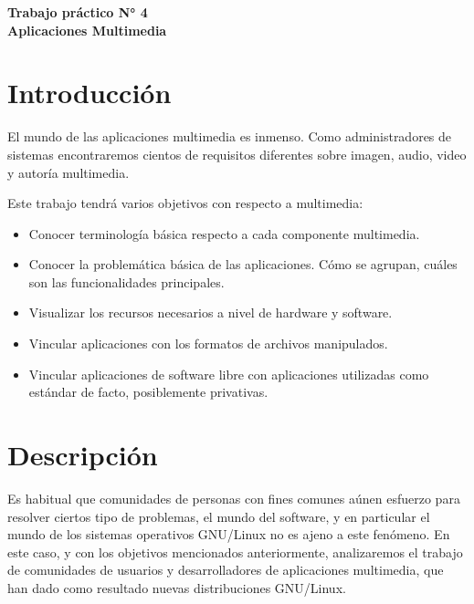 \documentclass[12pt]{article}
\def\maketitle{

    \makeatletter
    {\color{bl} \centering \huge \sc \textbf{
    Trabajo práctico N° 4\\
    \large \vspace*{-8pt} \color{black} Aplicaciones Multimedia
    \vspace*{8pt} }\par}
    \makeatother

    \makeatletter
    

}
\begin{document}
\thispagestyle{empty}
\maketitle
\setlength{\parindent}{0pt}

\section*{Introducción}


El mundo de las aplicaciones multimedia es inmenso. Como administradores de
sistemas encontraremos cientos de requisitos diferentes sobre imagen, audio,
video y autoría multimedia.

Este trabajo tendrá varios objetivos con respecto a multimedia:

\begin{itemize}

\item Conocer terminología básica respecto a cada componente multimedia.

    \item Conocer la problemática básica de las aplicaciones. Cómo se agrupan,
    cuáles son las funcionalidades principales.

    \item Visualizar los recursos necesarios a nivel de hardware y software.

    \item Vincular aplicaciones con los formatos de archivos manipulados.

    \item Vincular aplicaciones de software libre con aplicaciones utilizadas
    como estándar de facto, posiblemente privativas.

\end{itemize}

\section{Descripción}

Es habitual que comunidades de personas con fines comunes aúnen esfuerzo para
resolver ciertos tipo de problemas, el mundo del software, y en particular el
mundo de los sistemas operativos GNU/Linux no es ajeno a este fenómeno. En
este caso, y con los objetivos mencionados anteriormente, analizaremos el
trabajo de comunidades de usuarios y desarrolladores de aplicaciones
multimedia, que han dado como resultado nuevas distribuciones GNU/Linux.
\end{document}
